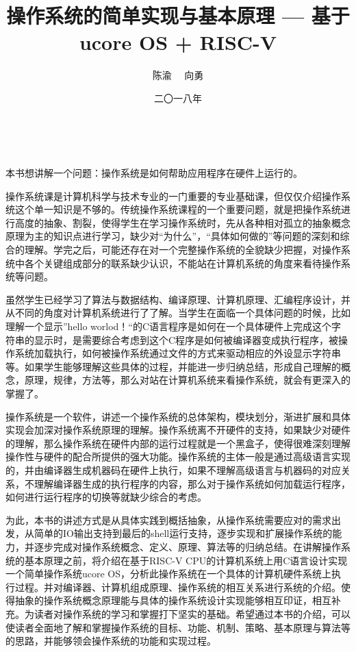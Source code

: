 \documentclass{zhbook}
\title{操作系统的简单实现与基本原理 \newline --- 基于ucore OS + RISC-V}
\author{陈渝 \ \ 向勇}
\date{二〇一八年}
\begin{document}
\, 
\maketitle

\frontmatter


本书想讲解一个问题：操作系统是如何帮助应用程序在硬件上运行的。

操作系统课是计算机科学与技术专业的一门重要的专业基础课，但仅仅介绍操作系统这个单一知识是不够的。传统操作系统课程的一个重要问题，就是把操作系统进行高度的抽象、割裂，使得学生在学习操作系统时，先从各种相对孤立的抽象概念原理为主的知识点进行学习，缺少对“为什么”，“具体如何做的”等问题的深刻和综合的理解。学完之后，可能还存在对一个完整操作系统的全貌缺少把握，对操作系统中各个关键组成部分的联系缺少认识，不能站在计算机系统的角度来看待操作系统等问题。

虽然学生已经学习了算法与数据结构、编译原理、计算机原理、汇编程序设计，并从不同的角度对计算机系统进行了了解。当学生在面临一个具体问题的时候，比如理解一个显示”hello worlod！“的C语言程序是如何在一个具体硬件上完成这个字符串的显示时，是需要综合考虑到这个C程序是如何被编译器变成执行程序，被操作系统加载执行，如何被操作系统通过文件的方式来驱动相应的外设显示字符串等。如果学生能够理解这些具体的过程，并能进一步归纳总结，形成自己理解的概念，原理，规律，方法等，那么对站在计算机系统来看操作系统，就会有更深入的掌握了。

操作系统是一个软件，讲述一个操作系统的总体架构，模块划分，渐进扩展和具体实现会加深对操作系统原理的理解。操作系统离不开硬件的支持，如果缺少对硬件的理解，那么操作系统在硬件内部的运行过程就是一个黑盒子，使得很难深刻理解操作性与硬件的配合所提供的强大功能。操作系统的主体一般是通过高级语言实现的，并由编译器生成机器码在硬件上执行，如果不理解高级语言与机器码的对应关系，不理解编译器生成的执行程序的内容，那么对于操作系统如何加载运行程序，如何进行运行程序的切换等就缺少综合的考虑。


为此，本书的讲述方式是从具体实践到概括抽象，从操作系统需要应对的需求出发，从简单的IO输出支持到最后的shell运行支持，逐步实现和扩展操作系统的能力，并逐步完成对操作系统概念、定义、原理、算法等的归纳总结。在讲解操作系统的基本原理之前，将介绍在基于RISC-V CPU的计算机系统上用C语言设计实现一个简单操作系统ucore OS，分析此操作系统在一个具体的计算机硬件系统上执行过程。并对编译器、计算机组成原理、操作系统的相互关系进行系统的介绍。使得抽象的操作系统概念原理能与具体的操作系统设计实现能够相互印证，相互补充。为读者对操作系统的学习和掌握打下坚实的基础。希望通过本书的介绍，可以使读者全面地了解和掌握操作系统的目标、功能、机制、策略、基本原理与算法等的思路，并能够领会操作系统的功能和实现过程。
\end{document}
